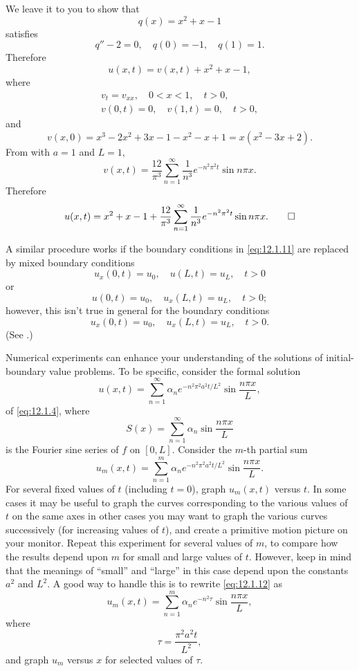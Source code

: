 \begin{solution}
We leave it to you to show that
\[
q(x)=x^2+x-1
\]
satisfies
\[
q''-2=0,\quad q(0)=-1,\quad q(1)=1.
\]
Therefore
\[
u(x,t)=v(x,t)+x^2+x-1,
\]
where
\begin{gather*}
v_t=v_{xx},\quad 0<x<1,\quad t>0,\\
v(0,t)=0,\quad v(1,t)=0,\quad t>0,
\end{gather*}
and
\[
v(x,0)=x^3-2x^2+3x-1-x^2-x+1=x(x^2-3x+2).
\]
From  with  $a=1$ and $L=1$,
\[
v(x,t)=
\frac{12}{\pi^3}\sum_{n=1}^\infty\frac{1}{n^3}
e^{-n^2\pi^2t}\sin n\pi x.
\]
Therefore
\[
u(x,t)=x^2+x-1+
\frac{12}{\pi^3}\sum_{n=1}^\infty\frac{1}{n^3}
e^{-n^2\pi^2t}\sin n\pi x.
\qedhere
\]
\end{solution}

A similar procedure works if the boundary conditions in \eqref{eq:12.1.11}
are replaced by mixed boundary conditions
\[
u_x(0,t)=u_0,\quad u(L,t)=u_L,\quad t>0
\]
or
\[
u(0,t)=u_0,\quad u_x(L,t)=u_L,\quad t>0;
\]
however, this isn't  true in general for the boundary conditions
\[
u_x(0,t)=u_0,\quad u_x(L,t)=u_L,\quad t>0.
\]
(See .)

\technology
 \medskip
Numerical experiments can enhance your understanding of the
solutions of initial-boundary value problems.
To be specific, consider
 the formal solution
\[
u(x,t)=\sum_{n=1}^\infty \alpha_ne^{-n^2\pi^2a^2t/L^2}\sin\frac{n\pi x}{L},
\]
of \eqref{eq:12.1.4},
where
\[
S(x)=\sum_{n=1}^\infty \alpha_n \sin\frac{n\pi x }{L}
\]
is the  Fourier sine series of $f$ on $[0,L]$.
Consider the $m$-th partial sum
\begin{equation} \label{eq:12.1.12}
u_m(x,t)=\sum_{n=1}^m \alpha_ne^{-n^2\pi^2a^2t/L^2}\sin\frac{n\pi x}{L}.
\end{equation}
For several fixed values of $t$ (including $t=0$), graph
$u_m(x,t)$ versus $t$.
In some cases it may be useful to
graph the curves corresponding to the various values of $t$
on the same axes   in other cases  you may want to graph
the various curves successively (for increasing values of $t$),
and create a primitive motion picture on your monitor.
Repeat this experiment for several values of $m$, to compare
how the results depend upon $m$ for small and large values of
$t$. However, keep in mind that the meanings of  ``small'' and ``large''
 in this case depend upon the constants $a^2$ and $L^2$.
A good way to handle this is to rewrite \eqref{eq:12.1.12}
as
\[
u_m(x,t)=\sum_{n=1}^m \alpha_ne^{-n^2\tau}\sin\frac{n\pi x}{L},
\]
where
\begin{equation} \label{eq:12.1.13}
\tau=\frac{\pi^2a^2t}{L^2},
\end{equation}
and graph $u_m$ versus $x$ for selected values of $\tau$.

